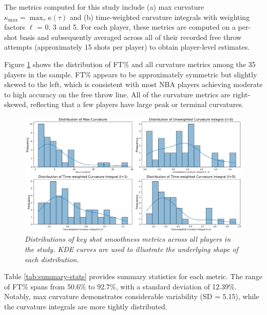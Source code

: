 \documentclass{article}
\begin{document}
    The metrics computed for this study include (a) max curvature $\kappa_{\max} = \max_\tau \kappa(\tau)$ and (b) time-weighted curvature integrals with weighting factors $\ell$ = 0, 3 and 5. For each player, these metrics are computed on a per-shot basis and subsequently averaged across all of their recorded free throw attempts (approximately 15 shots per player) to obtain player-level estimates.

    Figure \ref{fig:scattered} shows the distribution of FT\% and all curvature metrics among the 35 players in the sample. FT\% appears to be approximately symmetric but slightly skewed to the left, which is consistent with most NBA players achieving moderate to high accuracy on the free throw line. All of the curvature metrics are right-skewed, reflecting that a few players have large peak or terminal curvatures.

    \begin{figure}[H]
        \centering
        \includegraphics[width=0.8\linewidth]{reports/arxiv/distributions.png}
        \caption{\it Distributions of key shot smoothness metrics across all players in the study. KDE curves are used to illustrate the underlying shape of each distribution.}
        \label{fig:scattered}
    \end{figure}
    
    Table \ref{tab:summary-stats} provides summary statistics for each metric. The range of FT\% spans from 50.6\% to 92.7\%, with a standard deviation of 12.39\%. Notably, max curvature demonstrates considerable variability (SD = 5.15), while the curvature integrals are more tightly distributed.
\end{document}
